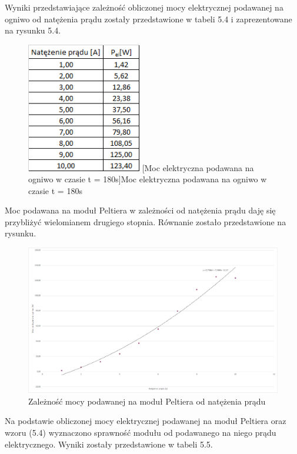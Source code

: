 \documentclass[oneside]{mgr}
\begin{document}
Wyniki przedstawiające zależność obliczonej mocy elektrycznej podawanej na ogniwo od natężenia prądu zostały przedstawione w tabeli 5.4 i zaprezentowane na rysunku 5.4.
\begin{center}
\begin{figure}[h!]
    \centering
    \includegraphics[width=5cm]{Pel_dane.png}
    [Moc elektryczna podawana na ogniwo w czasie t = 180s]{Moc elektryczna podawana na ogniwo w czasie t = 180s}
    \end{figure}
\end{center}

Moc podawana na moduł Peltiera w zależności od natężenia prądu daję się przybliżyć wielomianem drugiego stopnia. Równanie zostało przedstawione na rysunku.

\begin{center}
\begin{figure}[h!]
    \centering
    \includegraphics[width=\textwidth]{Pel_wykres.png}
    \caption{Zależność mocy podawanej na moduł Peltiera od natężenia prądu}
    \end{figure}
\end{center}

Na podstawie obliczonej mocy elektrycznej podawanej na moduł Peltiera oraz wzoru (5.4) wyznaczono sprawność modułu od podawanego na niego prądu elektrycznego. Wyniki zostały przedstawione w tabeli 5.5.
\end{document}
